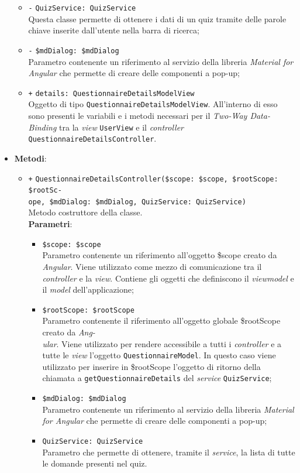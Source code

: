 \begin{itemize}
\begin{itemize}
		\item \texttt{-} \texttt{QuizService: QuizService} \\ Questa classe permette di ottenere i dati di un quiz tramite delle parole chiave inserite dall'utente nella barra di ricerca;
		\item \texttt{-} \texttt{\$mdDialog: \$mdDialog} \\
		Parametro contenente un riferimento al servizio della libreria \textit{Material for Angular} che permette di creare delle componenti a pop-up;
		\item \texttt{+} \texttt{details: QuestionnaireDetailsModelView} \\
		Oggetto di tipo \texttt{QuestionnaireDetailsModelView}. All'interno di esso sono presenti le variabili e i metodi necessari per il \textit{Two-Way Data-Binding} tra la \textit{view} \texttt{UserView} e il \textit{controller} \texttt{QuestionnaireDetailsController}.
	\end{itemize}
	\item \textbf{Metodi}:
	\begin{itemize}
		\item \texttt{+} \texttt{QuestionnaireDetailsController(\$scope: \$scope, \$rootScope: \$rootSc-\\ope, \$mdDialog: \$mdDialog, QuizService: QuizService)} \\ Metodo costruttore della classe. \\
		\textbf{Parametri}: 
		\begin{itemize}
			\item \texttt{\$scope: \$scope} \\
			Parametro contenente un riferimento all'oggetto \$scope creato da \textit{Angular}. Viene utilizzato come mezzo di comunicazione tra il \textit{controller} e la \textit{view}. Contiene gli oggetti che definiscono il \textit{viewmodel} e il \textit{model} dell'applicazione;
			\item \texttt{\$rootScope: \$rootScope} \\
			Parametro contenente il riferimento all'oggetto globale \$rootScope creato da \textit{Ang-\\ular{}}. Viene utilizzato per rendere accessibile a tutti i \textit{controller} e a tutte le \textit{view} l'oggetto \texttt{QuestionnaireModel}. In questo caso viene utilizzato per inserire in \$rootScope l'oggetto di ritorno della chiamata a \texttt{getQuestionnaireDetails} del \textit{service} \texttt{QuizService};	
			\item \texttt{\$mdDialog: \$mdDialog} \\
			Parametro contenente un riferimento al servizio della libreria \textit{Material for Angular} che permette di creare delle componenti a pop-up;
			\item \texttt{QuizService: QuizService}\\ Parametro che permette di ottenere, tramite il \textit{service}, la lista di tutte le domande presenti nel quiz.
		\end{itemize}
		

\end{itemize}
\end{itemize}

